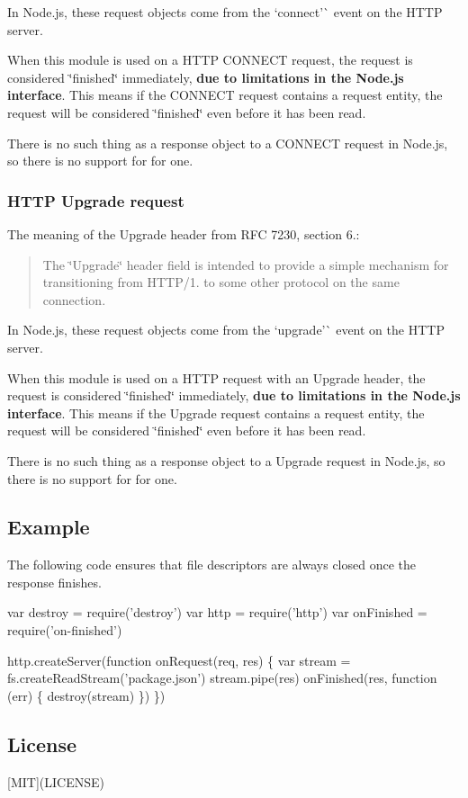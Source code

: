 In Node.\+js, these request objects come from the `\textquotesingle{}connect'\`{} event on the H\+T\+TP server.

When this module is used on a H\+T\+TP {\ttfamily C\+O\+N\+N\+E\+CT} request, the request is considered \char`\"{}finished\char`\"{} immediately, {\bfseries due to limitations in the Node.\+js interface}. This means if the {\ttfamily C\+O\+N\+N\+E\+CT} request contains a request entity, the request will be considered \char`\"{}finished\char`\"{} even before it has been read.

There is no such thing as a response object to a {\ttfamily C\+O\+N\+N\+E\+CT} request in Node.\+js, so there is no support for for one.

\subsubsection*{H\+T\+TP Upgrade request}

The meaning of the {\ttfamily Upgrade} header from R\+FC 7230, section 6.\+:

\begin{quote}
The \char`\"{}\+Upgrade\char`\"{} header field is intended to provide a simple mechanism for transitioning from H\+T\+T\+P/1. to some other protocol on the same connection. \end{quote}


In Node.\+js, these request objects come from the `\textquotesingle{}upgrade'\`{} event on the H\+T\+TP server.

When this module is used on a H\+T\+TP request with an {\ttfamily Upgrade} header, the request is considered \char`\"{}finished\char`\"{} immediately, {\bfseries due to limitations in the Node.\+js interface}. This means if the {\ttfamily Upgrade} request contains a request entity, the request will be considered \char`\"{}finished\char`\"{} even before it has been read.

There is no such thing as a response object to a {\ttfamily Upgrade} request in Node.\+js, so there is no support for for one.

\subsection*{Example}

The following code ensures that file descriptors are always closed once the response finishes.


\begin{DoxyCode}
var destroy = require('destroy')
var http = require('http')
var onFinished = require('on-finished')

http.createServer(function onRequest(req, res) \{
  var stream = fs.createReadStream('package.json')
  stream.pipe(res)
  onFinished(res, function (err) \{
    destroy(stream)
  \})
\})
\end{DoxyCode}


\subsection*{License}

\mbox{[}M\+IT\mbox{]}(L\+I\+C\+E\+N\+SE) 